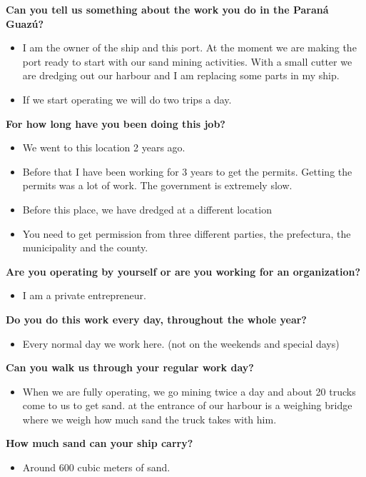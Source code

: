\textbf{Can you tell us something about the work you do in the Paraná Guazú?}
\begin{itemize}
    \item I am the owner of the ship and this port. At the moment we are making the port ready to start with our sand mining activities. With a small cutter we are dredging out our harbour and I am replacing some parts in my ship. 
    \item If we start operating we will do two trips a day. 
\end{itemize}

\textbf{For how long have you been doing this job?}
\begin{itemize}
    \item We went to this location 2 years ago.
    \item Before that I have been working for 3 years to get the permits. Getting the permits was a lot of work. The government is extremely slow. 
    \item Before this place, we have dredged at a different location
    \item You need to get permission from three different parties, the prefectura, the municipality and the county. 
\end{itemize}

\textbf{Are you operating by yourself or are you working for an organization?}
\begin{itemize}
    \item I am a private entrepreneur.  
\end{itemize}

\textbf{Do you do this work every day, throughout the whole year?}
\begin{itemize}
    \item Every normal day we work here. (not on the weekends and special days)
\end{itemize}

\textbf{Can you walk us through your regular work day?}
\begin{itemize}
    \item When we are fully operating, we go mining twice a day and about 20 trucks come to us to get sand. at the entrance of our harbour is a weighing bridge where we weigh how much sand the truck takes with him.
\end{itemize}

\textbf{How much sand can your ship carry?}
\begin{itemize}
    \item Around 600 cubic meters of sand. 
\end{itemize}

